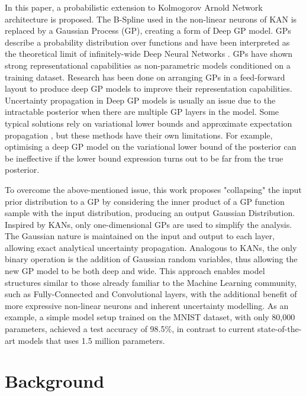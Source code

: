\documentclass{article}
\begin{document}
In this paper, a probabilistic extension to Kolmogorov Arnold Network architecture is proposed. The B-Spline used in the non-linear neurons of KAN is replaced by a Gaussian Process (GP), creating a form of Deep GP model. GPs describe a probability distribution over functions and have been interpreted as the theoretical limit of infinitely-wide Deep Neural Networks \cite{InfiniteWidthNNasGP,lee2018deep}. GPs have shown strong representational capabilities as non-parametric models conditioned on a training dataset. Research has been done on arranging GPs in a feed-forward layout to produce deep GP models \cite{deepGP} to improve their representation capabilities. Uncertainty propagation in Deep GP models is usually an issue due to the intractable posterior when there are multiple GP layers in the model. Some typical solutions rely on variational lower bounds \cite{deepGP} and approximate expectation propagation \cite{DeepGPapproximateEP}, but these methods have their own limitations. For example, optimising a deep GP model on the variational lower bound of the posterior can be ineffective if the lower bound expression turns out to be far from the true posterior.

To overcome the above-mentioned issue, this work proposes "collapsing" the input prior distribution to a GP by considering the inner product of a GP function sample with the input distribution, producing an output Gaussian Distribution. Inspired by KANs, only one-dimensional GPs are used to simplify the analysis. The Gaussian nature is maintained on the input and output to each layer, allowing exact analytical uncertainty propagation. Analogous to KANs, the only binary operation is the addition of Gaussian random variables, thus allowing the new GP model to be both deep and wide. This approach enables model structures similar to those already familiar to the Machine Learning community, such as Fully-Connected and Convolutional layers, with the additional benefit of more expressive non-linear neurons and inherent uncertainty modelling. As an example, a simple model setup trained  on the MNIST dataset, with only 80,000 parameters, achieved a test accuracy of 98.5\%, in contrast to current state-of-the-art models that uses 1.5 million parameters.


\section{Background}
\end{document}

